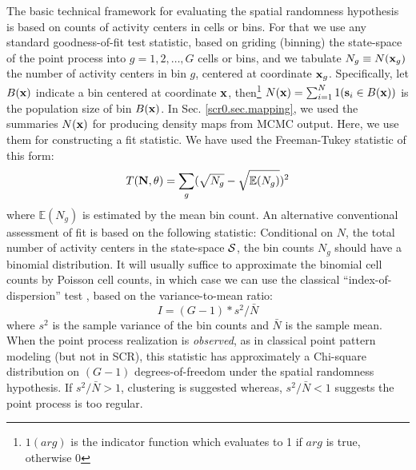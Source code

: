 
The basic technical framework for evaluating the spatial randomness
hypothesis is based on counts of activity centers in cells or bins.
For that we use any standard goodness-of-fit test statistic, based on
griding (binning) the state-space of the point process into
$g=1,2,\ldots,G$ cells or bins,
and we tabulate $N_{g} \equiv N({\bf
  x}_{g})$ the number of activity centers in bin $g$, centered at
coordinate ${\bf x}_{g}$.
Specifically, let $B({\bf x})$ indicate a bin centered at
coordinate ${\bf x}$, then\footnote{$1(arg)$ is the indicator function
  which evaluates to 1 if $arg$
  is true, otherwise 0} $N({\bf x})=\sum_{i=1}^{N} 1({\bf s}_{i} \in
B({\bf x}))$ is the population size of bin $B({\bf x})$.
In
Sec. \ref{scr0.sec.mapping}, we used the summaries $N({\bf x})$
for producing density maps from MCMC output. Here, we use them for
constructing a fit statistic.
We have used the 
Freeman-Tukey statistic of this form:
\[
T({\bf N}, \theta) =  \sum_{g}  (\sqrt{N_{g}} - \sqrt{\mathbb{E}(N_{g})})^{2}
\]
where $\mathbb{E}(N_{g})$ is estimated by the mean bin count.  An
alternative conventional assessment of fit is based on the following
statistic: Conditional on $N$, the total number of activity centers in
the state-space ${\cal S}$, the bin counts $N_{g}$ should have a
binomial distribution.  It will usually suffice to approximate the
binomial cell counts by Poisson cell counts, in which case we can use
the classical ``index-of-dispersion'' test
\citep[][p. 87]{illian_etal:2008}, based on the variance-to-mean ratio:
\[
   I =  (G -1)*s^2/\bar{N}
\]
where $s^{2}$ is the sample variance of the bin counts and $\bar{N}$
is the sample mean. When the point process realization is {\it
  observed}, as in classical point pattern modeling (but not in SCR),
this statistic has approximately a Chi-square distribution on $(G- 1)$ 
degrees-of-freedom under the spatial randomness
hypothesis.  If $s^2/\bar{N} > 1$, clustering is suggested whereas,
$s^2/\bar{N} <1$ suggests the point process is too regular.


